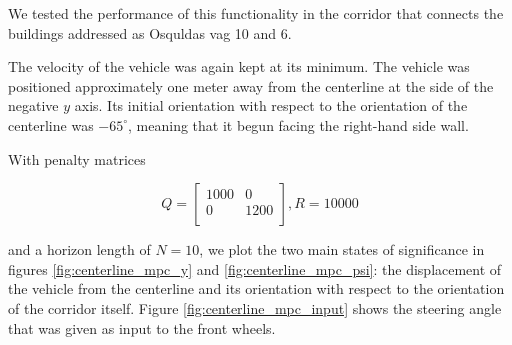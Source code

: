 


We tested the performance of this functionality in the corridor that
connects the buildings addressed as Osquldas vag 10 and 6.

The velocity of the vehicle was again kept at its minimum. The vehicle was
positioned approximately one meter away from the centerline at the side
of the negative $y$ axis. Its initial orientation with respect to the
orientation of the centerline was $-65^{\circ}$, meaning that it begun
facing the right-hand side wall.

With penalty matrices

\begin{equation}
  Q =
  \begin{bmatrix}
    1000 & 0    \\
      0  & 1200 \\
  \end{bmatrix}, R = 10000
\end{equation}

and a horizon length of $N=10$, we plot the two main states of significance in
figures \ref{fig:centerline_mpc_y} and \ref{fig:centerline_mpc_psi}:
the displacement of the vehicle from the centerline and its orientation with
respect to the orientation of the corridor itself.
Figure \ref{fig:centerline_mpc_input} shows the steering angle that was given
as input to the front wheels.


